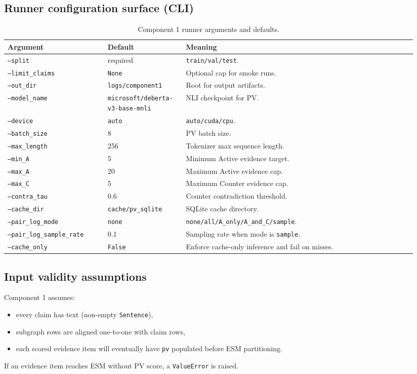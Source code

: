 \subsection{Runner configuration surface (CLI)}
\begin{table}[H]
\centering
\begin{tabular}{@{}p{0.23\linewidth}p{0.18\linewidth}p{0.53\linewidth}@{}}
\toprule
Argument & Default & Meaning \\
\midrule
\texttt{--split} & required & \texttt{train/val/test}. \\
\texttt{--limit\_claims} & \texttt{None} & Optional cap for smoke runs. \\
\texttt{--out\_dir} & \texttt{logs/component1} & Root for output artifacts. \\
\texttt{--model\_name} & \texttt{microsoft/deberta-v3-base-mnli} & NLI checkpoint for PV. \\
\texttt{--device} & \texttt{auto} & \texttt{auto/cuda/cpu}. \\
\texttt{--batch\_size} & 8 & PV batch size. \\
\texttt{--max\_length} & 256 & Tokenizer max sequence length. \\
\texttt{--min\_A} & 5 & Minimum Active evidence target. \\
\texttt{--max\_A} & 20 & Maximum Active evidence cap. \\
\texttt{--max\_C} & 5 & Maximum Counter evidence cap. \\
\texttt{--contra\_tau} & 0.6 & Counter contradiction threshold. \\
\texttt{--cache\_dir} & \texttt{cache/pv\_sqlite} & SQLite cache directory. \\
\texttt{--pair\_log\_mode} & \texttt{none} & \texttt{none/all/A\_only/A\_and\_C/sample}. \\
\texttt{--pair\_log\_sample\_rate} & 0.1 & Sampling rate when mode is \texttt{sample}. \\
\texttt{--cache\_only} & \texttt{False} & Enforce cache-only inference and fail on misses. \\
\bottomrule
\end{tabular}
\caption{Component 1 runner arguments and defaults.}
\label{tab:c1_cli_args}
\end{table}

\subsection{Input validity assumptions}
Component 1 assumes:
\begin{itemize}
\item every claim has text (non-empty \texttt{Sentence}),
\item subgraph rows are aligned one-to-one with claim rows,
\item each scored evidence item will eventually have \texttt{pv} populated before ESM partitioning.
\end{itemize}
If an evidence item reaches ESM without PV score, a \texttt{ValueError} is raised.
